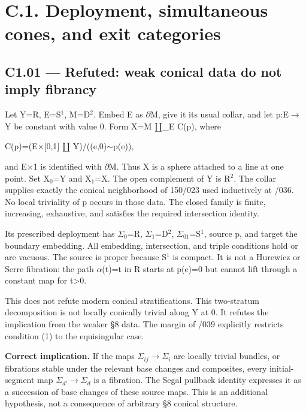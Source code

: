 \section{C.1. Deployment, simultaneous cones, and exit categories}\label{c.1.-deployment-simultaneous-cones-and-exit-categories}

\subsection{C1.01 --- Refuted: weak conical data do not imply fibrancy}\label{c1.01-refuted-weak-conical-data-do-not-imply-fibrancy}

Let Y=R, E=S\ensuremath{{}^{1}}, M=D\ensuremath{{}^{2}}. Embed E as \ensuremath{\partial}M, give it its usual collar, and let p:E\ensuremath{\to}Y be constant with value 0. Form X=M \ensuremath{\amalg}\_E C(p), where

C(p)=(E\ensuremath{\times}{[}0,1{]} \ensuremath{\amalg} Y)/((e,0)\ensuremath{\sim}p(e)),

and E\ensuremath{\times}1 is identified with \ensuremath{\partial}M. Thus X is a sphere attached to a line at one point. Set X\ensuremath{{}_{0}}=Y and X\ensuremath{{}_{1}}=X. The open complement of Y is R\ensuremath{{}^{2}}. The collar supplies exactly the conical neighborhood of 150/023 used inductively at /036. No local triviality of p occurs in those data. The closed family is finite, increasing, exhaustive, and satisfies the required intersection identity.

Its prescribed deployment has \ensuremath{\Sigma}\ensuremath{{}_{0}}=R, \ensuremath{\Sigma}\ensuremath{{}_{1}}=D\ensuremath{{}^{2}}, \ensuremath{\Sigma}\ensuremath{{}_{01}}=S\ensuremath{{}^{1}}, source p, and target the boundary embedding. All embedding, intersection, and triple conditions hold or are vacuous. The source is proper because S\ensuremath{{}^{1}} is compact. It is not a Hurewicz or Serre fibration: the path \ensuremath{\alpha}(t)=t in R starts at p(e)=0 but cannot lift through a constant map for t\textgreater0.

This does not refute modern conical stratifications. This two-stratum decomposition is not locally conically trivial along Y at 0. It refutes the implication from the weaker \S{}8 data. The margin of /039 explicitly restricts condition (1) to the equisingular case.

\textbf{Correct implication.} If the maps \ensuremath{\Sigma}\ensuremath{{}_{ij}}\ensuremath{\to}\ensuremath{\Sigma}\ensuremath{{}_{i}} are locally trivial bundles, or fibrations stable under the relevant base changes and composites, every initial-segment map \(\Sigma_{d\prime}\)\ensuremath{\to}\(\Sigma_d\) is a fibration. The Segal pullback identity expresses it as a succession of base changes of these source maps. This is an additional hypothesis, not a consequence of arbitrary \S{}8 conical structure.

